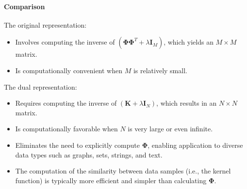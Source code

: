 \paragraph*{Comparison}
The original representation:
\begin{itemize}
    \item Involves computing the inverse of $(\boldsymbol{\Phi}\boldsymbol{\Phi}^T+\lambda\textbf{I}_M)$, which yields an  $M \times M$ matrix.
    \item Is computationally convenient when $M$ is relatively small.
\end{itemize}
The dual representation: 
\begin{itemize}
    \item Requires computing the inverse of $(\textbf{K}+\lambda\textbf{I}_N)$, which results in an $N \times N$ matrix.
    \item Is computationally favorable when $N$ is very large or even infinite.
    \item Eliminates the need to explicitly compute $\boldsymbol{\Phi}$, enabling application to diverse data types such as graphs, sets, strings, and text.
    \item The computation of the similarity between data samples (i.e., the kernel function) is typically more efficient and simpler than calculating $\boldsymbol{\Phi}$.
\end{itemize}